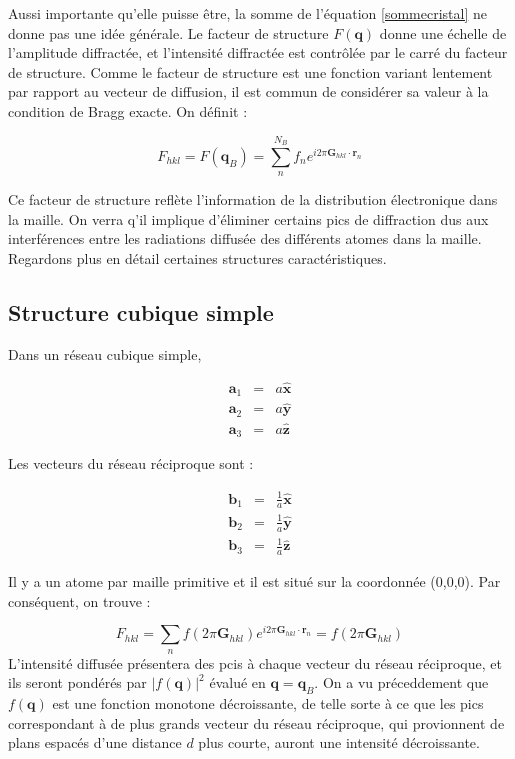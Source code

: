 Aussi importante qu'elle puisse être, la somme de l'équation \ref{sommecristal}
ne donne pas une idée générale. Le facteur de structure $F(\mathbf{q})$ donne une
échelle de l'amplitude diffractée, et l'intensité diffractée est contrôlée
par le carré du facteur de structure. Comme le facteur de structure est une
fonction variant lentement par rapport au vecteur de diffusion, il est commun de
considérer sa valeur à la condition de Bragg exacte. On définit :

\begin{equation}
    F_{hkl} = F(\mathbf{q}_B) = \sum_n^{N_B} f_n e^{i2\pi \mathbf{G}_{hkl}\cdot\mathbf{r}_n}
\end{equation}

Ce facteur de structure reflète l'information de la distribution électronique
dans la maille. On verra q'il implique d'éliminer certains pics de diffraction
dus aux interférences entre les radiations diffusée des différents atomes dans
la maille.
Regardons plus en détail certaines structures caractéristiques.

\subsection{Structure cubique simple}

Dans un réseau cubique simple,

\begin{eqnarray}
    \mathbf{a}_1 & = & a \mathbf{\hat x} \\
    \mathbf{a}_2 & = & a \mathbf{\hat y} \\
    \mathbf{a}_3 & = & a \mathbf{\hat z}
\end{eqnarray}

Les vecteurs du réseau réciproque sont :

\begin{eqnarray}
    \mathbf{b}_1 & = & \frac{1}{a} \mathbf{\hat x} \\
    \mathbf{b}_2 & = & \frac{1}{a} \mathbf{\hat y} \\
    \mathbf{b}_3 & = & \frac{1}{a} \mathbf{\hat z}
\end{eqnarray}

Il y a un atome par maille primitive et il est situé sur la coordonnée (0,0,0).
Par conséquent, on trouve :

\begin{equation}
    F_{hkl} = \sum_n f(2\pi \mathbf{G}_{hkl}) e^{i 2\pi \mathbf{G}_{hkl}\cdot\mathbf{r}_n } = f(2\pi\mathbf{G}_{hkl})
\end{equation}
L'intensité diffusée présentera des pcis à chaque vecteur du réseau réciproque,
et ils seront pondérés par $|f(\mathbf{q})|^2$ évalué en $\mathbf{q = q}_B$. On a
vu préceddement que $f(\mathbf{q})$ est une fonction monotone décroissante,
de telle sorte à ce que les pics correspondant à de plus grands vecteur du
réseau réciproque, qui provionnent de plans espacés d'une distance $d$ plus
courte, auront une intensité décroissante.
